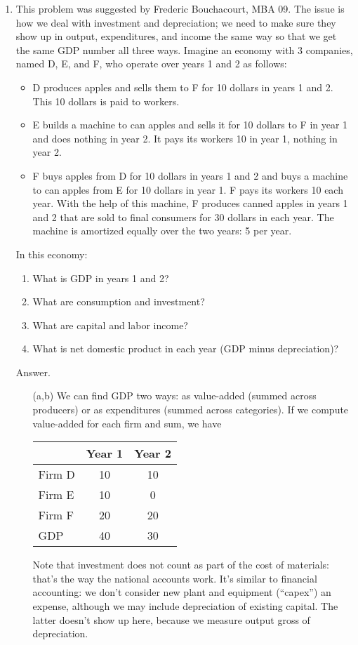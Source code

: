 \documentclass[12pt,letterpaper]{article}
\begin{document}
\begin{enumerate}
\item
This problem was suggested by Frederic Bouchacourt, MBA 09.
The issue is how we deal with investment and depreciation;
we need to make sure they show up in output, expenditures, and income
the same way so that we get the same GDP number all three ways.
Imagine an economy with 3 companies,
named D, E, and F,
who operate over years 1 and 2 as follows:
\begin{itemize}
\item D produces apples and sells them to F for 10 dollars
    in years 1 and 2.
    This 10 dollars is paid to workers.
\item E builds a machine to can apples and sells it for 10 dollars to F in year 1 and does nothing in year 2.
    It pays its workers 10 in year 1, nothing in year 2.
\item  F buys apples from D for 10 dollars in years 1 and 2 and buys a machine to can apples from E for 10 dollars in year 1.
    F pays its workers 10 each year.
    With the help of this machine, F produces canned apples in years 1 and 2 that are sold to final consumers for 30 dollars in each year.
The machine is amortized equally over the two years:  5 per year.
\end{itemize}
In this economy:
\begin{enumerate}
\item What is GDP in years 1 and 2?
\item What are consumption and investment?
\item What are capital and labor income?
\item What is net domestic product in each year
(GDP minus depreciation)?
\end{enumerate}

Answer.
\begin{enumerate}
\item[(a,b)]
We can find GDP two ways:  as value-added (summed across producers)
or as expenditures (summed across categories).
If we compute value-added for each firm and sum, we have
%
    \begin{center}
    \begin{tabular}{lcc}
            &  Year 1  & Year 2 \\
            \hline
    Firm D  &  10      &  10   \\
    Firm E  &  10      &  0 \\
    Firm F  &  20      &  20  \\
    \hline
    GDP     &  40   &    30
    \end{tabular}
    \end{center}
%
Note that investment does not count as part of the cost
of materials:  that's the way the national accounts work.
It's similar to financial accounting:  we don't consider
new plant and equipment (``capex'') an expense,
although we may include depreciation of existing capital.
The latter doesn't show up here, because we measure output
gross of depreciation.


\end{enumerate}
\end{enumerate}
\end{document}
